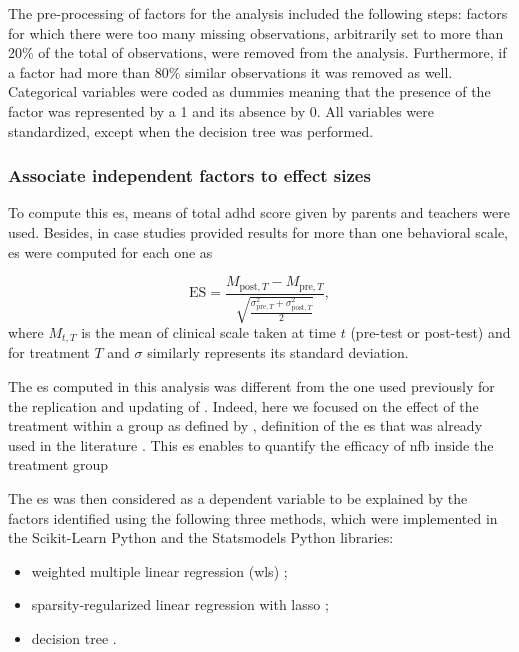 The pre-processing of factors for the analysis included the following steps: factors for which there were too many missing observations, 
arbitrarily set to more than 20\% of the total of observations, were removed from the analysis. Furthermore, if a factor had more than 
80\% similar observations it was removed as well. Categorical variables were coded as dummies meaning that the presence of the factor was represented by a 1 
and its absence by 0. All variables were standardized, except when the decision tree was performed. 

\subsubsection{Associate independent factors to effect sizes}

To compute this \gls{es}, means of total \gls{adhd} score given by parents and teachers were used. Besides, in case studies provided results 
for more than one behavioral scale, \gls{es} were computed for each one as 

\begin{equation}
\label{eq:factors_effect_size_within_subject}
\text{ES} = \frac{M_{\text{post},T} - M_{\text{pre},T}}{\sqrt{\frac{\sigma_{\text{pre},T}^2 + \sigma_{\text{post},T}^2}{2}}},
\end{equation} 
where $M_{t,T}$ is the mean of clinical scale taken at time $t$ (pre-test or post-test) and for treatment $T$ and $\sigma$ similarly represents its standard deviation.

The \gls{es} computed in this analysis was different from the one 
used previously for the replication and updating of \citet{Cortese2016}. Indeed, here we focused on the effect of the treatment within 
a group as defined by \citet{Cohen1988}, definition of the \gls{es} that was already used in the literature \citep{Arns2009, Maurizio2014, 
Strehl2017}. This \gls{es} enables to quantify the efficacy of \gls{nfb} inside the treatment group 

The \gls{es} was then considered as a dependent variable to be explained by the factors identified using the following three methods, which were 
implemented in the Scikit-Learn Python \citep[0.18.1]{Pedregosa2011} and the Statsmodels Python \citep[0.8.0]{Seabold2010} libraries:
\begin{itemize}
	\item weighted multiple linear regression (\gls{wls}) \citep{Montgomery2012}; 
	\item sparsity-regularized linear regression with \gls{lasso} \citep{Tibshirani1996};
	\item decision tree \citep{Quinlan1986}.
\end{itemize}

